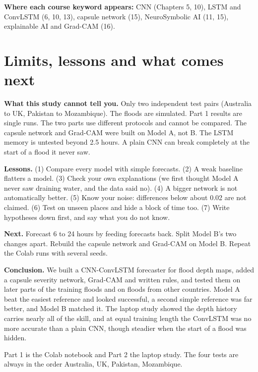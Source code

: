 \textbf{Where each course keyword appears:} CNN (Chapters 5, 10), LSTM and ConvLSTM (6, 10, 13), capsule network (15), NeuroSymbolic AI (11, 15), explainable AI and Grad-CAM (16).

\section{Limits, lessons and what comes next}\label{ch:limits}

\textbf{What this study cannot tell you.} Only two independent test pairs (Australia to UK, Pakistan to Mozambique). The floods are simulated. Part 1 results are single runs. The two parts use different protocols and cannot be compared. The capsule network and Grad-CAM were built on Model A, not B. The LSTM memory is untested beyond 2.5 hours. A plain CNN can break completely at the start of a flood it never saw.

\textbf{Lessons.} (1) Compare every model with simple forecasts. (2) A weak baseline flatters a model. (3) Check your own explanations (we first thought Model A never saw draining water, and the data said no). (4) A bigger network is not automatically better. (5) Know your noise: differences below about 0.02 are not claimed. (6) Test on unseen places and hide a block of time too. (7) Write hypotheses down first, and say what you do not know.

\textbf{Next.} Forecast 6 to 24 hours by feeding forecasts back. Split Model B's two changes apart. Rebuild the capsule network and Grad-CAM on Model B. Repeat the Colab runs with several seeds.

\textbf{Conclusion.} We built a CNN-ConvLSTM forecaster for flood depth maps, added a capsule severity network, Grad-CAM and written rules, and tested them on later parts of the training floods and on floods from other countries. Model A beat the easiest reference and looked successful, a second simple reference was far better, and Model B matched it. The laptop study showed the depth history carries nearly all of the skill, and at equal training length the ConvLSTM was no more accurate than a plain CNN, though steadier when the start of a flood was hidden.

\label{ch:nums}

Part 1 is the Colab notebook and Part 2 the laptop study. The four tests are always in the order Australia, UK, Pakistan, Mozambique.

